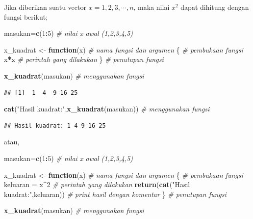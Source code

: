 \documentclass[
]{book}
\newenvironment{Shaded}{\begin{snugshade}}{\end{snugshade}}
\newcommand{\CommentTok}[1]{\textcolor[rgb]{0.56,0.35,0.01}{\textit{#1}}}
\newcommand{\ControlFlowTok}[1]{\textcolor[rgb]{0.13,0.29,0.53}{\textbf{#1}}}
\newcommand{\DecValTok}[1]{\textcolor[rgb]{0.00,0.00,0.81}{#1}}
\newcommand{\FunctionTok}[1]{\textcolor[rgb]{0.13,0.29,0.53}{\textbf{#1}}}
\newcommand{\NormalTok}[1]{#1}
\newcommand{\OtherTok}[1]{\textcolor[rgb]{0.56,0.35,0.01}{#1}}
\newcommand{\SpecialCharTok}[1]{\textcolor[rgb]{0.81,0.36,0.00}{\textbf{#1}}}
\newcommand{\StringTok}[1]{\textcolor[rgb]{0.31,0.60,0.02}{#1}}
\begin{document}
Jika diberikan suatu vector \(x=1,2,3,\cdots, n\), maka nilai \(x^2\) dapat dihitung dengan fungsi berikut;

\begin{Shaded}
\begin{Highlighting}[]
\NormalTok{masukan}\OtherTok{=}\FunctionTok{c}\NormalTok{(}\DecValTok{1}\SpecialCharTok{:}\DecValTok{5}\NormalTok{)                               }\CommentTok{\# nilai x awal (1,2,3,4,5)}

\NormalTok{x\_kuadrat }\OtherTok{\textless{}{-}} \ControlFlowTok{function}\NormalTok{(x)                     }\CommentTok{\# nama fungsi dan argumen}
\NormalTok{   \{                                         }\CommentTok{\# pembukaan fungsi}
\NormalTok{    x}\SpecialCharTok{*}\NormalTok{x                                      }\CommentTok{\# perintah yang dilakukan }
\NormalTok{   \}                                         }\CommentTok{\# penutupan fungsi}

\FunctionTok{x\_kuadrat}\NormalTok{(masukan)                           }\CommentTok{\# menggunakan fungsi}
\end{Highlighting}
\end{Shaded}

\begin{verbatim}
## [1]  1  4  9 16 25
\end{verbatim}

\begin{Shaded}
\begin{Highlighting}[]
\FunctionTok{cat}\NormalTok{(}\StringTok{"Hasil kuadrat:"}\NormalTok{,}\FunctionTok{x\_kuadrat}\NormalTok{(masukan))     }\CommentTok{\# menggunakan fungsi }
\end{Highlighting}
\end{Shaded}

\begin{verbatim}
## Hasil kuadrat: 1 4 9 16 25
\end{verbatim}

atau,

\begin{Shaded}
\begin{Highlighting}[]
\NormalTok{masukan}\OtherTok{=}\FunctionTok{c}\NormalTok{(}\DecValTok{1}\SpecialCharTok{:}\DecValTok{5}\NormalTok{)                               }\CommentTok{\# nilai x awal (1,2,3,4,5)}

\NormalTok{x\_kuadrat }\OtherTok{\textless{}{-}} \ControlFlowTok{function}\NormalTok{(x)                     }\CommentTok{\# nama fungsi dan argumen}
\NormalTok{   \{                                         }\CommentTok{\# pembukaan fungsi}
\NormalTok{    keluaran }\OtherTok{=}\NormalTok{ x}\SpecialCharTok{\^{}}\DecValTok{2}                           \CommentTok{\# perintah yang dilakukan }
    \FunctionTok{return}\NormalTok{(}\FunctionTok{cat}\NormalTok{(}\StringTok{"Hasil kuadrat:"}\NormalTok{,keluaran))   }\CommentTok{\# print hasil dengan komentar}
\NormalTok{   \}                                         }\CommentTok{\# penutupan fungsi}

\FunctionTok{x\_kuadrat}\NormalTok{(masukan)                           }\CommentTok{\# menggunakan fungsi}
\end{Highlighting}
\end{Shaded}
\end{document}
